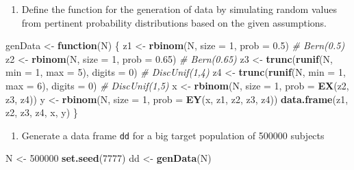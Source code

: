 \documentclass[
]{book}
\newenvironment{Shaded}{\begin{snugshade}}{\end{snugshade}}
\newcommand{\AttributeTok}[1]{\textcolor[rgb]{0.13,0.29,0.53}{#1}}
\newcommand{\CommentTok}[1]{\textcolor[rgb]{0.56,0.35,0.01}{\textit{#1}}}
\newcommand{\ControlFlowTok}[1]{\textcolor[rgb]{0.13,0.29,0.53}{\textbf{#1}}}
\newcommand{\DecValTok}[1]{\textcolor[rgb]{0.00,0.00,0.81}{#1}}
\newcommand{\FloatTok}[1]{\textcolor[rgb]{0.00,0.00,0.81}{#1}}
\newcommand{\FunctionTok}[1]{\textcolor[rgb]{0.13,0.29,0.53}{\textbf{#1}}}
\newcommand{\NormalTok}[1]{#1}
\newcommand{\OtherTok}[1]{\textcolor[rgb]{0.56,0.35,0.01}{#1}}
\providecommand{\tightlist}{%
  \setlength{\itemsep}{0pt}\setlength{\parskip}{0pt}}
\begin{document}
\begin{enumerate}
\def\labelenumi{\arabic{enumi}.}
\setcounter{enumi}{2}
\tightlist
\item
  Define the function for the generation of data by
  simulating random values from pertinent probability
  distributions based on the given assumptions.
\end{enumerate}

\begin{Shaded}
\begin{Highlighting}[]
\NormalTok{genData }\OtherTok{\textless{}{-}} \ControlFlowTok{function}\NormalTok{(N) \{}
\NormalTok{  z1 }\OtherTok{\textless{}{-}} \FunctionTok{rbinom}\NormalTok{(N, }\AttributeTok{size =} \DecValTok{1}\NormalTok{, }\AttributeTok{prob =} \FloatTok{0.5}\NormalTok{) }\CommentTok{\# Bern(0.5)}
\NormalTok{  z2 }\OtherTok{\textless{}{-}} \FunctionTok{rbinom}\NormalTok{(N, }\AttributeTok{size =} \DecValTok{1}\NormalTok{, }\AttributeTok{prob =} \FloatTok{0.65}\NormalTok{) }\CommentTok{\# Bern(0.65)}
\NormalTok{  z3 }\OtherTok{\textless{}{-}} \FunctionTok{trunc}\NormalTok{(}\FunctionTok{runif}\NormalTok{(N, }\AttributeTok{min =} \DecValTok{1}\NormalTok{, }\AttributeTok{max =} \DecValTok{5}\NormalTok{), }\AttributeTok{digits =} \DecValTok{0}\NormalTok{) }\CommentTok{\# DiscUnif(1,4)}
\NormalTok{  z4 }\OtherTok{\textless{}{-}} \FunctionTok{trunc}\NormalTok{(}\FunctionTok{runif}\NormalTok{(N, }\AttributeTok{min =} \DecValTok{1}\NormalTok{, }\AttributeTok{max =} \DecValTok{6}\NormalTok{), }\AttributeTok{digits =} \DecValTok{0}\NormalTok{) }\CommentTok{\# DiscUnif(1,5)}
\NormalTok{  x }\OtherTok{\textless{}{-}} \FunctionTok{rbinom}\NormalTok{(N, }\AttributeTok{size =} \DecValTok{1}\NormalTok{, }\AttributeTok{prob =} \FunctionTok{EX}\NormalTok{(z2, z3, z4))}
\NormalTok{  y }\OtherTok{\textless{}{-}} \FunctionTok{rbinom}\NormalTok{(N, }\AttributeTok{size =} \DecValTok{1}\NormalTok{, }\AttributeTok{prob =} \FunctionTok{EY}\NormalTok{(x, z1, z2, z3, z4))}
  \FunctionTok{data.frame}\NormalTok{(z1, z2, z3, z4, x, y)}
\NormalTok{\}}
\end{Highlighting}
\end{Shaded}

\begin{enumerate}
\def\labelenumi{\arabic{enumi}.}
\setcounter{enumi}{3}
\tightlist
\item
  Generate a data frame \texttt{dd} for a big target population of
  500000 subjects
\end{enumerate}

\begin{Shaded}
\begin{Highlighting}[]
\NormalTok{N }\OtherTok{\textless{}{-}} \DecValTok{500000}
\FunctionTok{set.seed}\NormalTok{(}\DecValTok{7777}\NormalTok{)}
\NormalTok{dd }\OtherTok{\textless{}{-}} \FunctionTok{genData}\NormalTok{(N)}
\end{Highlighting}
\end{Shaded}
\end{document}
